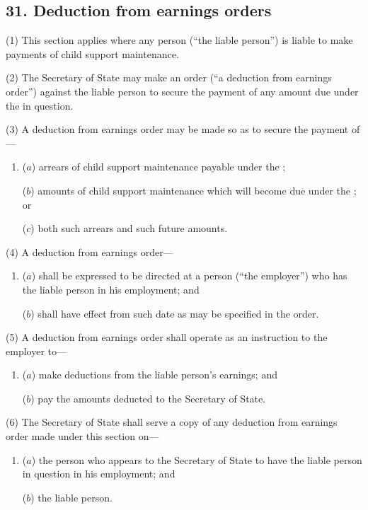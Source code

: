 \documentclass[12pt,a4paper]{article}
\begin{document}
\subsection{31. Deduction from earnings orders}

(1) This section applies where any person (“the liable person”) is liable
to make payments of child support maintenance.

(2)
The Secretary of State may make an order (“a deduction from earnings order”) against the liable person to secure the payment of any amount due under the  in question.

(3)
A deduction from earnings order may be made so as to secure the payment of---
\begin{enumerate}\item[]
($a$) arrears of child support maintenance payable under the ;

($b$) amounts of child support maintenance which will become due under the
; or

($c$) both such arrears and such future amounts.
\end{enumerate}

(4) A deduction from earnings order---
\begin{enumerate}\item[]
($a$) shall be expressed to be directed at a person (“the employer”) who has
the liable person in his employment; and

($b$) shall have effect from such date as may be specified in the order.
\end{enumerate}

(5)
A deduction from earnings order shall operate as an instruction to the employer to---
\begin{enumerate}\item[]
($a$) make deductions from the liable person’s earnings; and

($b$) pay the amounts deducted to the Secretary of State.
\end{enumerate}

(6)
The Secretary of State shall serve a copy of any deduction from earnings order made under this section on---
\begin{enumerate}\item[]
($a$) the person who appears to the Secretary of State to have the liable person
in question in his employment; and

($b$) the liable person.
\end{enumerate}
\end{document}
